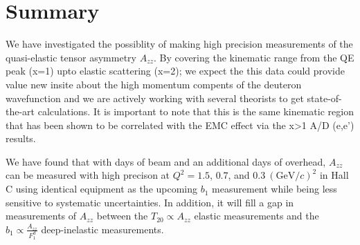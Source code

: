\section{Summary}

We have investigated the possiblity of making high precision measurements of the quasi-elastic tensor asymmetry $A_{zz}$.  By covering the kinematic range from the QE peak (x=1) upto elastic scattering (x=2); we expect the this data could provide value new insite about the high momentum compents of the deuteron wavefunction and we are actively working with several theorists to get state-of-the-art calculations.   It is important to note that this is the same kinematic region that has been shown to be correlated with the EMC effect via the x>1 A/D (e,e') results. 

We have found that with \productiondays days of beam and an additional \overheaddays days of overhead, $A_{zz}$ can be measured with high precison at $Q^2=1.5$, $0.7$, and $0.3~(\mathrm{GeV}/c)^2$ in Hall C using identical equipment as the upcoming $b_1$ measurement while being less sensitive to systematic uncertainties. In addition, it will fill a gap in measurements of $A_{zz}$ between the $T_{20}\propto A_{zz}$ elastic measurements and the $b_1\propto \frac{A_{zz}}{F_1^d}$ deep-inelastic measurements.  
